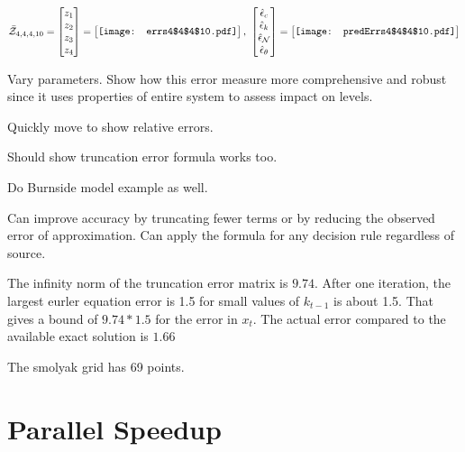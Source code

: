 \documentclass[12pt]{article}
\begin{document}
\begin{gather*}
\bar{\mathcal{Z}}_{4,4,4,10}=\begin{bmatrix}
z_1\\
z_2\\
z_3\\
z_4
 \end{bmatrix}= \begin{bmatrix}
\vcenter{\hbox{\texttt{[image: errs4\$4\$4\$10.pdf]}}}
 \end{bmatrix},\,\, \begin{bmatrix}
\hat{\epsilon}_c\\\hat{\epsilon}_k\\\hat{\epsilon}_\mathcal{N}\\\hat{\epsilon}_\theta
 \end{bmatrix}=\begin{bmatrix}
\vcenter{\hbox{\texttt{[image: predErrs4\$4\$4\$10.pdf]}}}
 \end{bmatrix}
\end{gather*}

Vary parameters.  Show how this error measure more comprehensive and robust
since it uses properties of entire system to assess impact on levels.

Quickly move to show relative errors.

Should show truncation error formula works too.

Do Burnside model example as well.

Can improve accuracy by truncating fewer terms or by reducing the observed 
error of approximation.  Can apply the formula for any decision rule regardless of source.

The infinity norm of the truncation error matrix is $9.74$.  After one iteration, the largest eurler equation error is 1.5 for small values of $k_{t-1}$ is about 1.5.  That gives a bound of $9.74*1.5$ for the error in $x_t$.  The actual error compared to the available exact solution is  $1.66$

The smolyak grid has 69 points.

\section{Parallel Speedup}
\label{sec:parallel-speedup}





  

\end{document}
